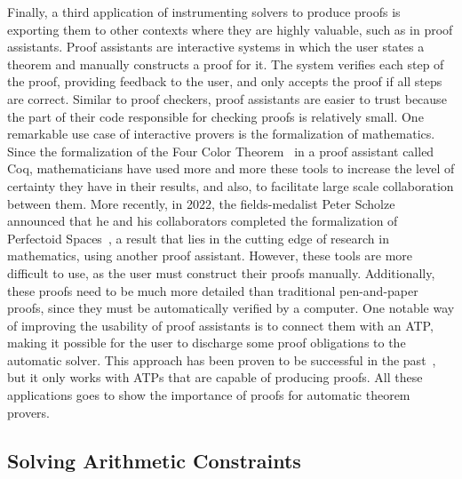 \documentclass[a4paper, 12pt]{article}
\begin{document}
Finally, a third application of instrumenting solvers to produce proofs is exporting them to
other contexts where they are highly valuable, such as in proof assistants.
%
Proof assistants are interactive systems in which the user states a theorem and manually constructs
a proof for it. The system verifies each step of the proof, providing feedback to the user, and only
accepts the proof if all steps are correct.
%
Similar to proof checkers, proof assistants are easier to trust because the part of their code
responsible for checking proofs is relatively small.
%
One remarkable use case of interactive provers is the formalization of mathematics.
Since the formalization of the Four Color Theorem~\cite{fctCoq} in a proof assistant called Coq,
mathematicians have used more and more these tools to increase the level of certainty
they have in their results, and also, to facilitate large scale collaboration between them.
More recently, in 2022, the fields-medalist Peter Scholze announced that he and his collaborators
completed the formalization of Perfectoid Spaces~\cite{scholze}, a result that lies in the
cutting edge of research in mathematics, using another proof assistant.
%
However, these tools are more difficult to use, as the user must construct their proofs
manually. Additionally, these proofs need to be much more detailed than traditional pen-and-paper proofs,
since they must be automatically verified by a computer.
%
One notable way of improving the usability of proof assistants is to connect them with an ATP,
making it possible for the user to discharge some proof obligations to the automatic solver.
This approach has been proven to be successful in the past~\cite{coq2, reconstruct}, but it
only works with ATPs that are capable of producing proofs.
%
All these applications goes to show the importance of proofs for automatic theorem provers.


\subsection{Solving Arithmetic Constraints}
\end{document}
